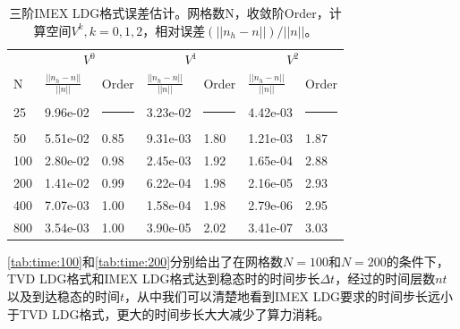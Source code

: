 \begin{table}
	\begin{tabularx}{\textwidth}{@{} *7{X} @{}}
		\toprule
		    & \multicolumn{2}{c}{$V^0$} & \multicolumn{2}{c}{$V^1$} & \multicolumn{2}{c}{$V^2$}                                                                       \\
		\cmidrule(lr){2-3} \cmidrule(lr){4-5} \cmidrule(lr){6-7}
		N   & $\frac{||n_h-n||}{||n||}$ & Order                     & $\frac{||n_h-n||}{||n||}$ & Order              & $\frac{||n_h-n||}{||n||}$ & Order              \\
		\midrule
		25  & 9.96e-02                  & \rule{\len}{0.4pt}        & 3.23e-02                  & \rule{\len}{0.4pt} & 4.42e-03                  & \rule{\len}{0.4pt} \\
		50  & 5.51e-02                  & 0.85                      & 9.31e-03                  & 1.80               & 1.21e-03                  & 1.87               \\
		100 & 2.80e-02                  & 0.98                      & 2.45e-03                  & 1.92               & 1.65e-04                  & 2.88               \\
		200 & 1.41e-02                  & 0.99                      & 6.22e-04                  & 1.98               & 2.16e-05                  & 2.93               \\
		400 & 7.07e-03                  & 1.00                      & 1.58e-04                  & 1.98               & 2.79e-06                  & 2.95               \\
		800 & 3.54e-03                  & 1.00                      & 3.90e-05                  & 2.02               & 3.41e-07                  & 3.03               \\
		\bottomrule
	\end{tabularx}
	\caption{三阶IMEX LDG格式误差估计。网格数N，收敛阶Order，计算空间$V^k, k=0,1,2$，相对误差$(||n_h-n||)/||n||$。}
	\label{tab:IMEXLDGerror:3}
\end{table}
\autoref{tab:time:100}和\autoref{tab:time:200}分别给出了在网格数$N=100$和$N=200$的条件下，TVD LDG格式和IMEX LDG格式达到稳态时的时间步长$\Delta t$，经过的时间层数$nt$以及到达稳态的时间$t$，从中我们可以清楚地看到IMEX LDG要求的时间步长远小于TVD LDG格式，更大的时间步长大大减少了算力消耗。

